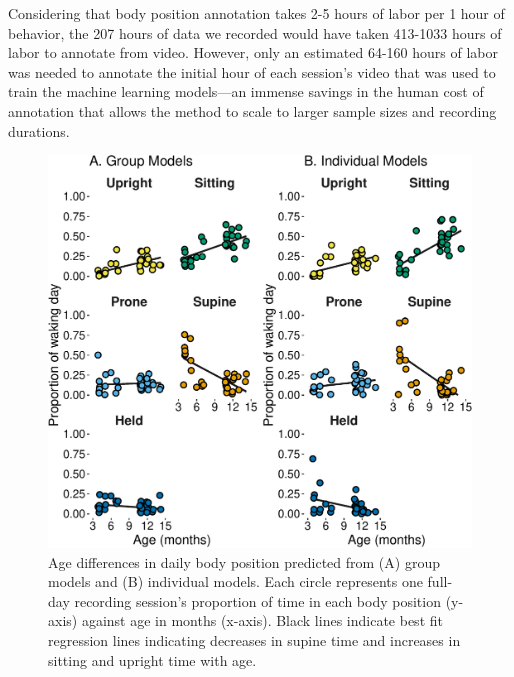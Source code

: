 \documentclass[
  man]{apa6}
\begin{document}
Considering that body position annotation takes 2-5 hours of labor per 1 hour of behavior, the 207 hours of data we recorded would have taken 413-1033 hours of labor to annotate from video. However, only an estimated 64-160 hours of labor was needed to annotate the initial hour of each session's video that was used to train the machine learning models---an immense savings in the human cost of annotation that allows the method to scale to larger sample sizes and recording durations.

\begin{figure}

{\centering \includegraphics{manuscript_files/figure-latex/age-1} 

}

\caption{Age differences in daily body position predicted from (A) group models and (B) individual models. Each circle represents one full-day recording session's proportion of time in each body position (y-axis) against age in months (x-axis). Black lines indicate best fit regression lines indicating decreases in supine time and increases in sitting and upright time with age.}\label{fig:age}
\end{figure}
\end{document}
